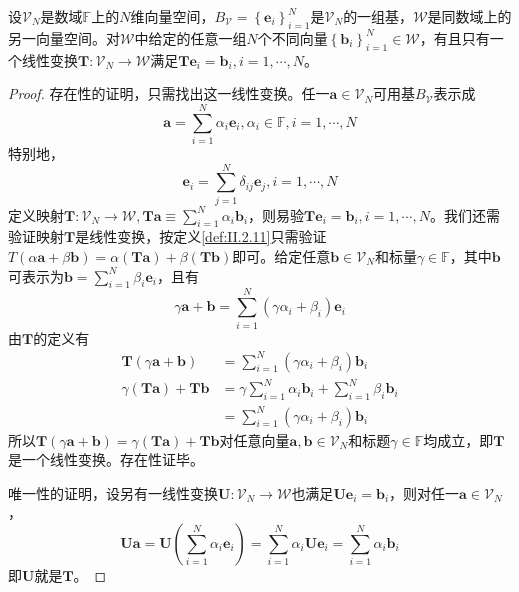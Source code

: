 \documentclass[main.tex]{subfiles}
\begin{document}
\begin{lemma}\label{lem:II.2.1}
    设$\mathcal{V}_N$是数域$\mathbb{F}$上的$N$维向量空间，$B_\mathcal{V}=\left\{\mathbf{e}_i\right\}_{i=1}^N$是$\mathcal{V}_N$的一组基，$\mathcal{W}$是同数域上的另一向量空间。对$\mathcal{W}$中给定的任意一组$N$个不同向量$\left\{\mathbf{b}_i\right\}_{i=1}^N\in\mathcal{W}$，有且只有一个线性变换$\mathbf{T}:\mathcal{V}_N\rightarrow\mathcal{W}$满足$\mathbf{Te}_i=\mathbf{b}_i,i=1,\cdots,N$。
\end{lemma}
\begin{proof}
    存在性的证明，只需找出这一线性变换。任一$\mathbf{a}\in\mathcal{V}_N$可用基$B_\mathcal{V}$表示成
    \[\mathbf{a}=\sum_{i=1}^N\alpha_i\mathbf{e}_i,\alpha_i\in\mathbb{F},i=1,\cdots,N\]
    特别地，
    \[\mathbf{e}_i=\sum_{j=1}^N\delta_{ij}\mathbf{e}_j,i=1,\cdots,N\]
    定义映射$\mathbf{T}:\mathcal{V}_N\rightarrow\mathcal{W},\mathbf{Ta}\equiv\sum_{i=1}^N\alpha_i\mathbf{b}_i$，则易验$\mathbf{Te}_i=\mathbf{b}_i,i=1,\cdots,N$。我们还需验证映射$\mathbf{T}$是线性变换，按定义\ref{def:II.2.11}只需验证$T\left(\alpha\mathbf{a}+\beta\mathbf{b}\right)=\alpha\left(\mathbf{Ta}\right)+\beta\left(\mathbf{Tb}\right)$即可。给定任意$\mathbf{b}\in\mathcal{V}_N$和标量$\gamma\in\mathbb{F}$，其中$\mathbf{b}$可表示为$\mathbf{b}=\sum_{i=1}^N\beta_i\mathbf{e}_i$，且有
    \[\gamma\mathbf{a}+\mathbf{b}=\sum_{i=1}^N\left(\gamma\alpha_i+\beta_i\right)\mathbf{e}_i\]
    由$\mathbf{T}$的定义有
    \begin{align}
        \mathbf{T}\left(\gamma\mathbf{a}+\mathbf{b}\right) & =\sum_{i=1}^N\left(\gamma\alpha_i+\beta_i\right)\mathbf{b}_i            \\
        \gamma\left(\mathbf{Ta}\right)+\mathbf{Tb}         & =\gamma\sum_{i=1}^N\alpha_i\mathbf{b}_i+\sum_{i=1}^N\beta_i\mathbf{b}_i \\
                                                           & =\sum_{i=1}^N\left(\gamma\alpha_i+\beta_i\right)\mathbf{b}_i
    \end{align}
    所以$\mathbf{T}\left(\gamma\mathbf{a}+\mathbf{b}\right)=\gamma\left(\mathbf{Ta}\right)+\mathbf{Tb}$对任意向量$\mathbf{a},\mathbf{b}\in\mathcal{V}_N$和标题$\gamma\in\mathbb{F}$均成立，即$\mathbf{T}$是一个线性变换。存在性证毕。

    唯一性的证明，设另有一线性变换$\mathbf{U}:\mathcal{V}_N\rightarrow\mathcal{W}$也满足$\mathbf{Ue}_i=\mathbf{b}_i$，则对任一$\mathbf{a}\in\mathcal{V}_N$，
    \[
        \mathbf{Ua}=\mathbf{U}\left(\sum_{i=1}^N\alpha_i\mathbf{e}_i\right)=\sum_{i=1}^N\alpha_i\mathbf{Ue}_i=\sum_{i=1}^N\alpha_i\mathbf{b}_i\]
    即$\mathbf{U}$就是$\mathbf{T}$。
\end{proof}
\end{document}
